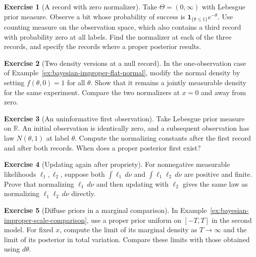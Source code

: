 \documentclass[11pt,oneside]{book}
\theoremstyle{definition}
\newtheorem{exercise}{Exercise}[section]
\theoremstyle{remark}
\newcommand{\R}{\mathbb R}
\begin{document}
\begin{exercise}[A record with zero normalizer]
\label{exer:bayesian-improper-zero-normalizer}
Take $\Theta=(0,\infty)$ with Lebesgue prior measure. Observe
a bit whose probability of success is
$\mathbf 1_{\{\theta\leq1\}}e^{-\theta}$. Use counting measure on the observation space, which also
contains a third record with probability zero at all labels. Find the normalizer at each of the three
records, and specify the records where a proper posterior results.
\end{exercise}

\begin{exercise}[Two density versions at a null record]
\label{exer:bayesian-improper-density-version}
In the one-observation case of
Example~\ref{ex:bayesian-improper-flat-normal}, modify the normal
density by setting $f(\theta,0)=1$ for all $\theta$. Show that it
remains a jointly measurable density for the same experiment.
Compare the two normalizers at $x=0$ and away from zero.
\end{exercise}

\begin{exercise}[An uninformative first observation]
\label{exer:bayesian-improper-delayed-propriety}
Take Lebesgue prior measure on $\R$. An initial observation
is identically zero, and a subsequent observation has law
$N(\theta,1)$ at label $\theta$. Compute the normalizing
constants after the first record and after both records.
When does a proper posterior first exist?
\end{exercise}

\begin{exercise}[Updating again after propriety]
\label{exer:bayesian-improper-sequential-update}
For nonnegative measurable likelihoods $\ell_1,\ell_2$,
suppose both $\int\ell_1\,d\nu$ and $\int\ell_1\ell_2\,d\nu$
are positive and finite. Prove that normalizing
$\ell_1\,d\nu$ and then updating with $\ell_2$ gives the same
law as normalizing $\ell_1\ell_2\,d\nu$ directly.
\end{exercise}

\begin{exercise}[Diffuse priors in a marginal comparison]
\label{exer:bayesian-improper-diffuse-model-comparison}
In Example~\ref{ex:bayesian-improper-scale-comparison}, use a
proper prior uniform on $[-T,T]$ in the second model. For
fixed $x$, compute the limit of its marginal density as
$T\to\infty$ and the limit of its posterior in total variation.
Compare these limits with those obtained using $d\theta$.
\end{exercise}
\end{document}
